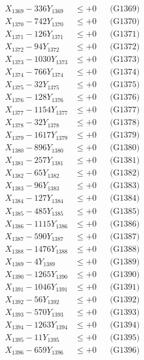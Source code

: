 \documentclass[a4paper,10pt]{article}
\begin{document}
{\begin{align}
X_{1369} - 336Y_{1369} &\leq +0 && \text{(G1369)} \\
X_{1370} - 742Y_{1370} &\leq +0 && \text{(G1370)} \\
\allowbreak
X_{1371} - 126Y_{1371} &\leq +0 && \text{(G1371)} \\
X_{1372} - 94Y_{1372} &\leq +0 && \text{(G1372)} \\
X_{1373} - 1030Y_{1373} &\leq +0 && \text{(G1373)} \\
X_{1374} - 766Y_{1374} &\leq +0 && \text{(G1374)} \\
X_{1375} - 32Y_{1375} &\leq +0 && \text{(G1375)} \\
X_{1376} - 128Y_{1376} &\leq +0 && \text{(G1376)} \\
X_{1377} - 1154Y_{1377} &\leq +0 && \text{(G1377)} \\
X_{1378} - 32Y_{1378} &\leq +0 && \text{(G1378)} \\
X_{1379} - 1617Y_{1379} &\leq +0 && \text{(G1379)} \\
X_{1380} - 896Y_{1380} &\leq +0 && \text{(G1380)} \\
\allowbreak
X_{1381} - 257Y_{1381} &\leq +0 && \text{(G1381)} \\
X_{1382} - 65Y_{1382} &\leq +0 && \text{(G1382)} \\
X_{1383} - 96Y_{1383} &\leq +0 && \text{(G1383)} \\
X_{1384} - 127Y_{1384} &\leq +0 && \text{(G1384)} \\
X_{1385} - 485Y_{1385} &\leq +0 && \text{(G1385)} \\
X_{1386} - 1115Y_{1386} &\leq +0 && \text{(G1386)} \\
X_{1387} - 590Y_{1387} &\leq +0 && \text{(G1387)} \\
X_{1388} - 1476Y_{1388} &\leq +0 && \text{(G1388)} \\
X_{1389} - 4Y_{1389} &\leq +0 && \text{(G1389)} \\
X_{1390} - 1265Y_{1390} &\leq +0 && \text{(G1390)} \\
\allowbreak
X_{1391} - 1046Y_{1391} &\leq +0 && \text{(G1391)} \\
X_{1392} - 56Y_{1392} &\leq +0 && \text{(G1392)} \\
X_{1393} - 570Y_{1393} &\leq +0 && \text{(G1393)} \\
X_{1394} - 1263Y_{1394} &\leq +0 && \text{(G1394)} \\
X_{1395} - 11Y_{1395} &\leq +0 && \text{(G1395)} \\
X_{1396} - 659Y_{1396} &\leq +0 && \text{(G1396)} \\

\end{align}}
\end{document}
